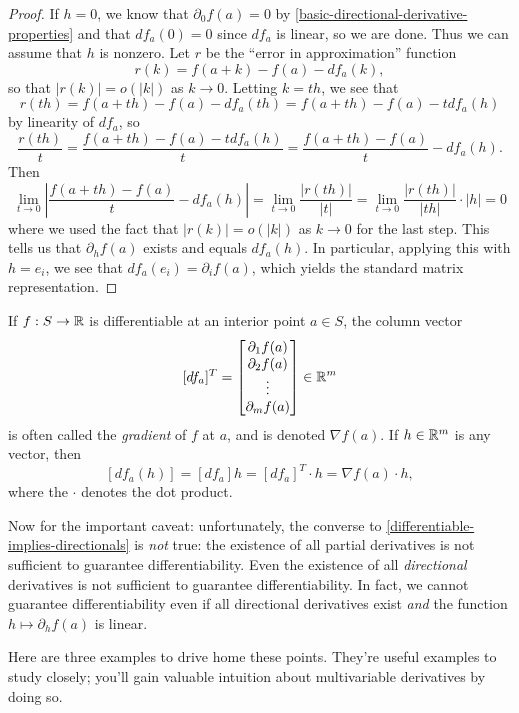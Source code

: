 \begin{proof}
	If $h = 0$, we know that $\partial_0 f(a) = 0$ by \cref{basic-directional-derivative-properties} and that $df_a(0) = 0$ since $df_a$ is linear, so we are done. Thus we can assume that $h$ is nonzero. Let $r$ be the ``error in approximation'' function
	\[ r(k) = f(a+k) - f(a) - df_a(k), \]
	so that $|r(k)| = o(|k|)$ as $k \to 0$. Letting $k = th$, we see that
	\[ r(th) = f(a+th) - f(a) - df_a(th) = f(a+th) - f(a) - t df_a(h) \]
	by linearity of $df_a$, so
	\[ \frac{r(th)}{t} = \frac{f(a+th) - f(a) - tdf_a(h)}{t} = \frac{f(a+th) - f(a)}{t} - df_a(h). \]
	Then 
	\[\lim_{t \to 0} \left| \frac{f(a+th) - f(a)}{t} - df_a(h) \right| 
	= \lim_{t \to 0} \frac{|r(th)|}{|t|} = \lim_{t \to 0} \frac{|r(th)|}{|th|} \cdot |h| = 0 \]
	where we used the fact that $|r(k)| = o(|k|)$ as $k \to 0$ for the last step. This tells us that $\partial_h f(a)$ exists and equals $df_a(h)$. In particular, applying this with $h = e_i$, we see that $df_a(e_i) = \partial_i f(a)$, which yields the standard matrix representation.  
\end{proof}

\begin{remark} \label{gradient}
	If $f : S \to \mathbb{R}$ is differentiable at an interior point $a \in S$, the column vector \[ [df_a]^T = \begin{bmatrix} \partial_1 f(a) \\ \partial_2 f(a) \\ \vdots \\ \partial_m f(a) \end{bmatrix} \in \mathbb{R}^m \]
	is often called the \emph{gradient}  of $f$ at $a$, and is denoted $\nabla f(a)$. If $h \in \mathbb{R}^m$ is any vector, then 
	\[ [df_a(h)] = [df_a]h = [df_a]^T \cdot h = \nabla f(a) \cdot h, \]
	where the $\cdot$ denotes the dot product. 
\end{remark}

Now for the important caveat: unfortunately, the converse to \cref{differentiable-implies-directionals} is \emph{not} true: the existence of all partial derivatives is not sufficient to guarantee differentiability. Even the existence of all \emph{directional} derivatives is not sufficient to guarantee differentiability. In fact, we cannot guarantee differentiability even if all directional derivatives exist \emph{and} the function $h \mapsto \partial_h f(a)$ is linear. 

Here are three examples to drive home these points. They're useful examples to study closely; you'll gain valuable intuition about multivariable derivatives by doing so. 


